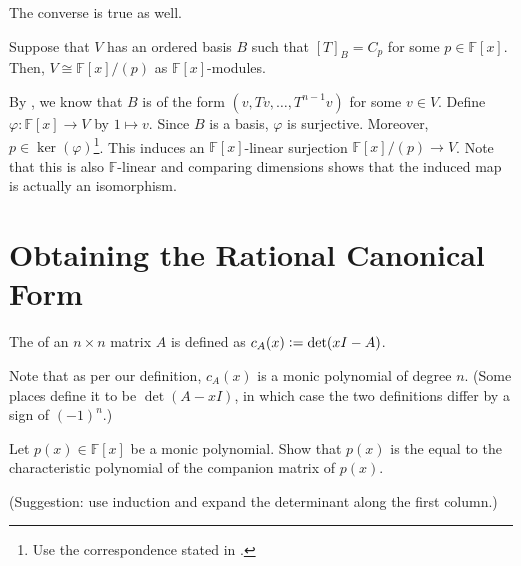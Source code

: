 \documentclass[12pt]{article}
\begin{document}
The converse is true as well.

\begin{thm} \label{thm:converse-good-basis}
	Suppose that $V$ has an ordered basis $B$ such that $[T]_{B} = C_{p}$ for some $p \in \mathbb{F}[x]$. Then, $V \cong \mathbb{F}[x]/(p)$ as $\mathbb{F}[x]$-modules.
\end{thm}
\begin{sketch}
	By , we know that $B$ is of the form $(v, Tv, \ldots, T^{n - 1}v)$ for some $v \in V$. Define $\varphi : \mathbb{F}[x] \to V$ by $1 \mapsto v$. Since $B$ is a basis, $\varphi$ is surjective. Moreover, $p \in \ker(\varphi)$\footnote{Use the correspondence stated in .}. This induces an $\mathbb{F}[x]$-linear surjection $\mathbb{F}[x]/(p) \to V$. Note that this is also $\mathbb{F}$-linear and comparing dimensions shows that the induced map is actually an isomorphism.
\end{sketch}

\section{Obtaining the Rational Canonical Form}

\begin{defn}
	The  of an $n \times n$ matrix $A$ is defined as $c_{A}(x) \vcentcolon= \det(xI - A)$.
\end{defn}

Note that as per our definition, $c_{A}(x)$ is a monic polynomial of degree $n$. (Some places define it to be $\det(A - xI)$, in which case the two definitions differ by a sign of $(-1)^{n}$.)

\begin{exe} \label{exe:characteristic-companion}
	Let $p(x) \in \mathbb{F}[x]$ be a monic polynomial. Show that $p(x)$ is the equal to the characteristic polynomial of the companion matrix of $p(x)$. 

	(Suggestion: use induction and expand the determinant along the first column.)
\end{exe}

\end{document}
